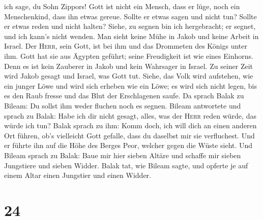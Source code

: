 ich sage, du Sohn Zippors!  Gott ist nicht ein Mensch,
dass er lüge, noch ein Menschenkind, dass ihn etwas gereue. Sollte er
etwas sagen und nicht tun? Sollte er etwas reden und nicht halten?
 Siehe, zu segnen bin ich hergebracht; er segnet, und ich
kann's nicht wenden.  Man sieht keine Mühe in Jakob und
keine Arbeit in Israel. Der \textsc{Herr}, sein Gott, ist bei ihm und
das Drommeten des Königs unter ihm.  Gott hat sie aus
Ägypten geführt; seine Freudigkeit ist wie eines Einhorns.
 Denn es ist kein Zauberer in Jakob und kein Wahrsager in
Israel. Zu seiner Zeit wird Jakob gesagt und Israel, was Gott tut.
 Siehe, das Volk wird aufstehen, wie ein junger Löwe und
wird sich erheben wie ein Löwe; es wird sich nicht legen, bis es den
Raub fresse und das Blut der Erschlagenen saufe.  Da
sprach Balak zu Bileam: Du sollst ihm weder fluchen noch es segnen.
 Bileam antwortete und sprach zu Balak: Habe ich dir
nicht gesagt, alles, was der \textsc{Herr} reden würde, das würde ich
tun?  Balak sprach zu ihm: Komm doch, ich will dich an
einen anderen Ort führen, ob's vielleicht Gott gefalle, dass du daselbst
mir sie verfluchest.  Und er führte ihn auf die Höhe des
Berges Peor, welcher gegen die Wüste sieht.  Und Bileam
sprach zu Balak: Baue mir hier sieben Altäre und schaffe mir sieben
Jungstiere und sieben Widder.  Balak tat, wie Bileam
sagte, und opferte je auf einem Altar einen Jungstier und einen Widder.

\hypertarget{section-23}{%
\section{24}\label{section-23}}

